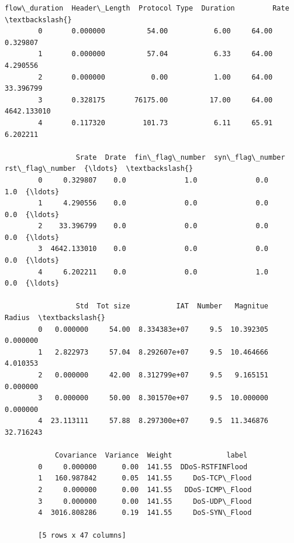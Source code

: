 \documentclass[11pt]{article}
\makeatletter
\newcommand{\boxspacing}{\kern\kvtcb@left@rule\kern\kvtcb@boxsep}
\newcommand{\prompt}[4]{
        {\ttfamily\llap{{\color{#2}[#3]:\hspace{3pt}#4}}\vspace{-\baselineskip}}
    }
\makeatother
\begin{document}
                    \begin{tcolorbox}[breakable, size=fbox, boxrule=.5pt, pad at break*=1mm, opacityfill=0]
        \prompt{Out}{outcolor}{96}{\boxspacing}
        \begin{Verbatim}[commandchars=\\\{\}]
           flow\_duration  Header\_Length  Protocol Type  Duration         Rate  \textbackslash{}
        0       0.000000          54.00           6.00     64.00     0.329807
        1       0.000000          57.04           6.33     64.00     4.290556
        2       0.000000           0.00           1.00     64.00    33.396799
        3       0.328175       76175.00          17.00     64.00  4642.133010
        4       0.117320         101.73           6.11     65.91     6.202211
        
                 Srate  Drate  fin\_flag\_number  syn\_flag\_number  rst\_flag\_number  {\ldots}  \textbackslash{}
        0     0.329807    0.0              1.0              0.0              1.0  {\ldots}
        1     4.290556    0.0              0.0              0.0              0.0  {\ldots}
        2    33.396799    0.0              0.0              0.0              0.0  {\ldots}
        3  4642.133010    0.0              0.0              0.0              0.0  {\ldots}
        4     6.202211    0.0              0.0              1.0              0.0  {\ldots}
        
                 Std  Tot size           IAT  Number   Magnitue     Radius  \textbackslash{}
        0   0.000000     54.00  8.334383e+07     9.5  10.392305   0.000000
        1   2.822973     57.04  8.292607e+07     9.5  10.464666   4.010353
        2   0.000000     42.00  8.312799e+07     9.5   9.165151   0.000000
        3   0.000000     50.00  8.301570e+07     9.5  10.000000   0.000000
        4  23.113111     57.88  8.297300e+07     9.5  11.346876  32.716243
        
            Covariance  Variance  Weight             label
        0     0.000000      0.00  141.55  DDoS-RSTFINFlood
        1   160.987842      0.05  141.55     DoS-TCP\_Flood
        2     0.000000      0.00  141.55   DDoS-ICMP\_Flood
        3     0.000000      0.00  141.55     DoS-UDP\_Flood
        4  3016.808286      0.19  141.55     DoS-SYN\_Flood
        
        [5 rows x 47 columns]
        \end{Verbatim}
        \end{tcolorbox}
                
\end{document}
